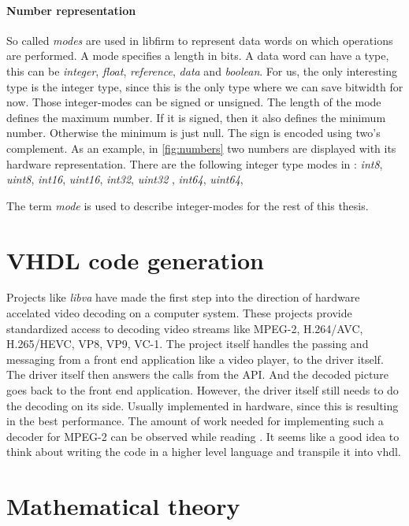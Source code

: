 \paragraph{Number representation}
So called \textit{modes} are used in libfirm to represent data words on which operations are performed. A mode specifies a length in bits. A data word can have a type, this can be \textit{integer}, \textit{float}, \textit{reference}, \textit{data} and \textit{boolean}. For us, the only interesting type is the integer type, since this is the only type where we can save bitwidth for now. Those integer-modes can be signed or unsigned. The length of the mode defines the maximum number. If it is signed, then it also defines the minimum number. Otherwise the minimum is just null. The sign is encoded using two's complement. As an example, in \autoref{fig:numbers} two numbers are displayed with its hardware representation. There are the following integer type modes in \libFIRM : 
\textit{int8},
\textit{uint8},
\textit{int16},
\textit{uint16},
\textit{int32},
\textit{uint32} ,
\textit{int64},
\textit{uint64},

The term \textit{mode} is used to describe integer-modes for the rest of this thesis.

\section{VHDL code generation}
Projects like \textit{libva} have made the first step into the direction of hardware accelated video decoding on a computer system. These projects provide standardized access to decoding video streams like MPEG-2, H.264/AVC, H.265/HEVC, VP8, VP9, VC-1. The project itself handles the passing and messaging from a front end application like a video player, to the driver itself. The driver itself then answers the calls from the API. And the decoded picture goes back to the front end application. However, the driver itself still needs to do the decoding on its side. Usually implemented in hardware, since this is resulting in the best performance. The amount of work needed for implementing such a decoder for MPEG-2 can be observed while reading \cite{mpeg2-modelling}.
It seems like a good idea to think about writing the code in a higher level language and transpile it into vhdl. 

\section{Mathematical theory}

